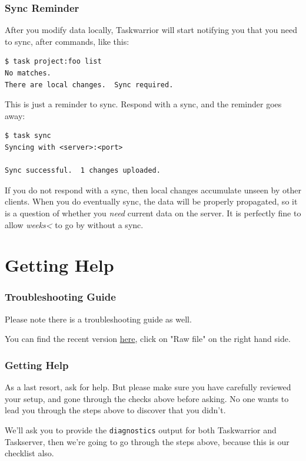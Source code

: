 \documentclass[t,handout]{beamer}
\begin{document}
\begin{frame}[fragile]\frametitle{Sync Reminder}
    \vfill
    After you modify data locally, Taskwarrior will start notifying you that you need to sync, after commands, like this:

    \begin{lstlisting}
$ task project:foo list
No matches.
There are local changes.  Sync required.\end{lstlisting}

    This is just a reminder to sync. Respond with a sync, and the reminder goes away:

    \begin{lstlisting}
$ task sync
Syncing with <server>:<port>

Sync successful.  1 changes uploaded.\end{lstlisting}

    If you do not respond with a sync, then local changes accumulate unseen by other clients. When you do eventually sync, the data will be properly propagated, so it is a question of whether you \emph{need} current data on the server. It is perfectly fine to allow \emph{weeks<} to go by without a sync.
\end{frame}

\section{Getting Help}

\begin{frame}[fragile]\frametitle{Troubleshooting Guide}
    \vfill
    \begin{alertblock}{}
        Please note there is a troubleshooting guide as well.

        You can find the recent version \href{https://git.tasktools.org/projects/ST/repos/guides/browse/taskserver-troubleshooting/taskserver-troubleshooting.pdf}{here}, click on "Raw file" on the right hand side.
    \end{alertblock}
\end{frame}

\begin{frame}[fragile]\frametitle{Getting Help}
    \vfill
    As a last resort, ask for help. But please make sure you have carefully reviewed your setup, and gone through the checks above before asking. No one wants to lead you through the steps above to discover that you didn't.

    We'll ask you to provide the \verb+diagnostics+ output for both Taskwarrior and Taskserver, then we're going to go through the steps above, because this is our checklist also.
\end{frame}
\end{document}
